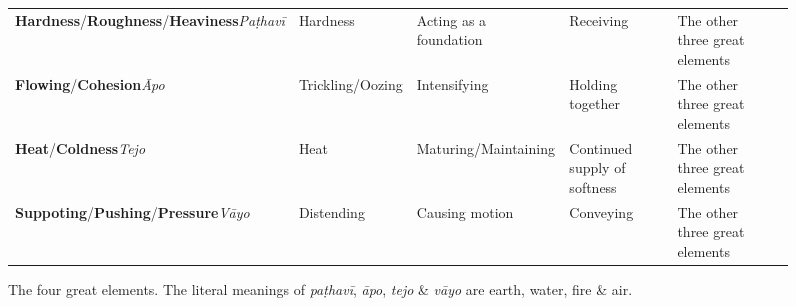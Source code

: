 \begin{figure} [H]

\setlength{\tabcolsep}{0pt}
\renewcommand{\arraystretch}{1.1}

\noindent\begin{tabular}{P{0.25\textwidth} | C{.185\textwidth} C{0.185\textwidth} C{0.185\textwidth} C{0.195\textwidth} m{0mm}}
\toprule
 &  &  &  & \\
\midrule
\textbf{Hardness}/\newline \textbf{Roughness}/\newline \textbf{Heaviness}\newline \textit{Paṭhavī} & Hardness & Acting as a foundation & Receiving & The other three great elements &\\[15mm]
\textbf{Flowing}/\newline \textbf{Cohesion}\newline \textit{Āpo} & Trickling/\newline Oozing & Intensifying & Holding together & The other three great elements &\\[15mm]
\textbf{Heat}/\newline \textbf{Coldness}\newline \textit{Tejo} & Heat & Maturing/\newline Maintaining & Continued supply of softness & The other three great elements &\\[15mm]
\textbf{Suppoting}/\newline \textbf{Pushing}/\newline \textbf{Pressure}\newline \textit{Vāyo} & Distending & Causing motion & Conveying & The other three great elements &\\[15mm]
\bottomrule
\end{tabular} 

\caption[]{The four great elements. The literal meanings of \textit{paṭhavī}, \textit{āpo}, \textit{tejo} \& \textit{vāyo} are earth, water, fire \& air.\footnotemark}

\end{figure}


